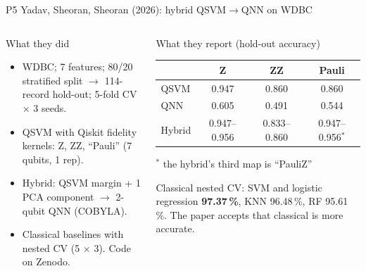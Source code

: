 \documentclass[aspectratio=169,10pt,t,xcolor={table}]{beamer}
\begin{document}
\begin{frame}{P5 \quad Yadav, Sheoran, Sheoran (2026): hybrid QSVM$\to$QNN on WDBC}
\begin{columns}[T]
\begin{block}{What they did}
\footnotesize
\begin{itemize}
  \item WDBC; 7 features; 80/20 stratified split $\to$ 114-record hold-out; 5-fold CV $\times$ 3 seeds.
  \item QSVM with Qiskit fidelity kernels: Z, ZZ, ``Pauli'' (7 qubits, 1 rep).
  \item Hybrid: QSVM margin + 1 PCA component $\to$ 2-qubit QNN (COBYLA).
  \item Classical baselines with nested CV (5 $\times$ 3). Code on Zenodo.
\end{itemize}
\end{block}
\begin{block}{What they report (hold-out accuracy)}
\scriptsize
\begin{tabular}{lccc}
\toprule
 & Z & ZZ & Pauli \\
\midrule
QSVM & 0.947 & 0.860 & 0.860 \\
QNN & 0.605 & 0.491 & 0.544 \\
Hybrid & 0.947--0.956 & 0.833--0.860 & 0.947--0.956$^{*}$ \\
\bottomrule
\end{tabular}
\par{\tiny $^{*}$ the hybrid's third map is ``PauliZ''}
\par\smallskip\footnotesize
Classical nested CV: SVM and logistic regression \textbf{97.37\,\%}, KNN 96.48\,\%, RF 95.61\,\%. The paper accepts that classical is more accurate.
\end{block}
\end{columns}
\end{frame}
\end{document}
